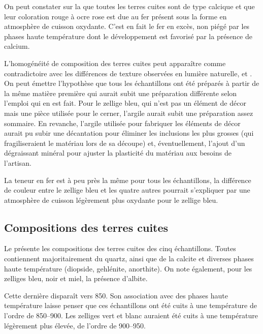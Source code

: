 On peut constater sur la  que toutes les terres 
cuites sont de type calcique et que leur coloration rouge à ocre rose 
est due au fer présent sous la forme  en atmosphère de 
cuisson oxydante. C'est en fait le fer en excès, non piégé par les 
phases haute température dont le développement est favorisé par la 
présence de calcium.

L'homogénéité de composition des terres cuites peut apparaître comme 
contradictoire avec les différences de texture observées en lumière 
naturelle, \CL et \MEB[ie]. On peut émettre l'hypothèse que tous les 
échantillons ont été préparés à partir de la même matière première 
qui aurait subit une préparation différente selon l'emploi qui en est 
fait. Pour le zellige bleu, qui n'est pas un élément de décor mais une 
pièce utilisée pour le cerner, l'argile aurait subit une préparation 
assez sommaire. En revanche, l'argile utilisée pour fabriquer les 
éléments de décor aurait pu subir une décantation pour éliminer les 
inclusions les plus grosses (qui fragiliseraient le matériau lors de 
sa découpe) et, éventuellement, l'ajout d'un dégraissant minéral pour 
ajuster la plasticité du matériau aux besoins de l'artisan.

La teneur en fer est à peu près la même pour tous les échantillons, 
la différence de couleur entre le zellige bleu et les quatre autres 
pourrait s'expliquer par une atmosphère de cuisson légèrement plus 
oxydante pour le zellige bleu.

\subsection{Compositions \cristallos des terres cuites}
Le  présente les compositions \cristallos des terres cuites des cinq échantillons. Toutes contiennent majoritairement du quartz, ainsi que de la calcite et diverses phases haute température (diopside, gehlénite, anorthite). On note également, pour les zelliges bleu, noir et miel, la présence d'albite.

Cette dernière disparaît vers \SI{850}{\degC}. Son association avec des phases haute température laisse penser que ces échantillons ont été cuits à une température de l'ordre de \SIrange[range-phrase=\ à\ ]{850}{900}{\degC}. Les zelliges vert et blanc auraient été cuits à une température légèrement plus élevée, de l'ordre de \SIrange[range-phrase=\ à\ ]{900}{950}{\degC}.


